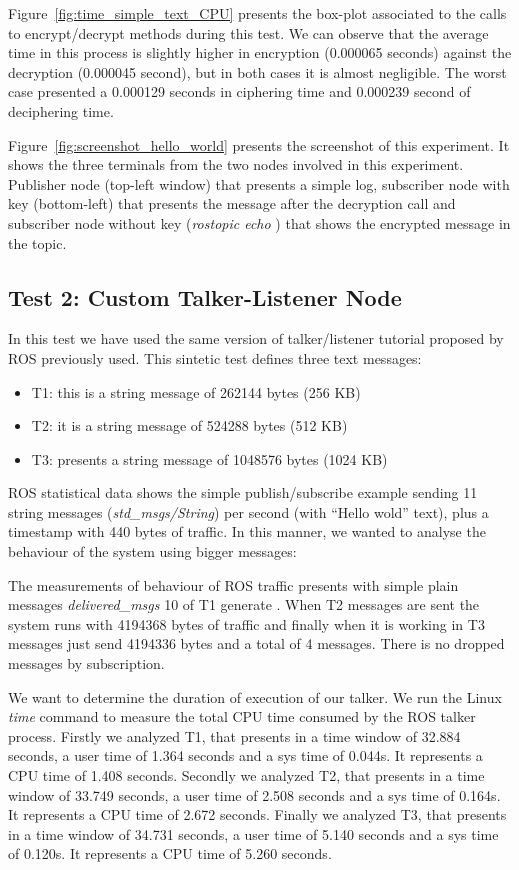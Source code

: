 \documentclass[journal,twoside]{JoPhA}
\begin{document}
Figure~\ref{fig:time_simple_text_CPU} presents the box-plot associated to the calls to encrypt/decrypt methods during this test.  We can observe that the average time in this process is slightly higher in encryption (0.000065 seconds) against the decryption  (0.000045 second), but in both cases it is almost negligible. The worst case presented a 0.000129 seconds in ciphering time and  0.000239 second of deciphering time.


Figure~\ref{fig:screenshot_hello_world} presents the screenshot of this experiment. It shows the three terminals from the two nodes involved in this experiment. Publisher node (top-left window) that presents a simple log, subscriber node with key (bottom-left) that presents the message after the decryption call and subscriber node without key ({\em rostopic echo }) that shows the encrypted message in the topic.


\subsection{Test 2: Custom Talker-Listener Node}


In this test we have used the same version of talker/listener tutorial proposed by ROS previously used. This sintetic test defines three text messages:
\begin{itemize}
\item T1: this is a string message of 262144 bytes (256 KB)
\item T2: it is a string message of 524288 bytes (512 KB)
\item T3: presents a string message of 1048576 bytes (1024 KB)
\end{itemize}  



ROS statistical data shows the simple publish/subscribe example sending 11 string messages ({\em std\_msgs/String}) per second (with ``Hello wold'' text), plus a timestamp with 440 bytes of traffic.
In this manner, we wanted to analyse the behaviour of the system using bigger messages:

The measurements of behaviour of ROS traffic presents with simple plain messages {\em delivered\_msgs} 10 of T1 generate . When T2 messages are sent the system runs with 4194368 bytes of traffic and finally when it is working in  T3 messages just send 4194336 bytes and a total of 4 messages. There is no dropped messages by subscription.

We want to determine the duration of execution of our talker. We run the Linux {\em time} command to measure the total CPU time consumed by the ROS talker process. 
Firstly we analyzed T1, that presents in a time window of 32.884 seconds, a user time of  1.364 seconds and a sys time of 0.044s. It represents a CPU time of 1.408 seconds.
Secondly we analyzed T2, that presents in a time window of 33.749 seconds, a user time of  2.508 seconds and a sys time of 0.164s. It represents a CPU time of 2.672 seconds.
Finally we analyzed T3, that presents in a time window of 34.731 seconds, a user time of  5.140 seconds and a sys time of 0.120s. It represents a CPU time of 5.260 seconds.
\end{document}
